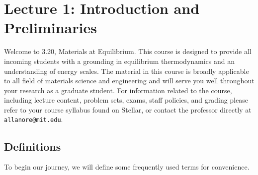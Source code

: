\documentclass[12pt]{article}
\def\dbar{{\mathchar'26\mkern-12mu d}}
\begin{document}

\section{Lecture 1: Introduction and Preliminaries}

Welcome to 3.20, Materials at Equilibrium.  This course is designed to provide all incoming students with a grounding in equilibrium thermodynamics and an understanding of energy scales.  The material in this course is broadly applicable to all field of materials science and engineering and will serve you well throughout your research as a graduate student.  For information related to the course, including lecture content, problem sets, exams, staff policies, and grading please refer to your course syllabus found on Stellar, or contact the professor directly at \texttt{allanore@mit.edu}.

\subsection{Definitions}
To begin our journey, we will define some frequently used terms for convenience.
\end{document}
